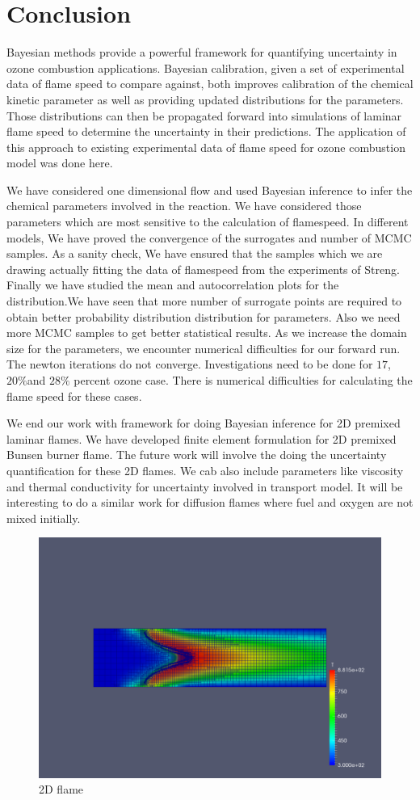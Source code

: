 
\chapter{Conclusion}\label{chap:conclusion}


Bayesian methods provide a powerful framework for quantifying uncertainty in ozone
combustion applications. Bayesian calibration, given a set of experimental data of flame speed to compare
against, both improves calibration of the chemical kinetic parameter as well as providing
updated distributions for the parameters. Those distributions can then be
propagated forward into simulations of laminar flame speed to determine the uncertainty in
their predictions. The application of this approach to existing experimental data of flame speed for ozone combustion model was done here.


 We have considered one dimensional flow and used Bayesian inference to infer the chemical parameters involved in the reaction. We have considered those parameters which are most sensitive to the calculation of flamespeed. In different models, We have proved the convergence of the surrogates and  number of MCMC samples. As a sanity check, We have ensured that the samples which we are drawing actually fitting the data of flamespeed from the experiments of Streng\cite{Streng}. Finally we have studied the mean and autocorrelation plots for the distribution.We have seen that more number of surrogate points are required to obtain better probability distribution distribution for parameters. Also we need more MCMC samples to get better statistical results. As we increase the domain size for the parameters, we encounter numerical difficulties for our forward run. The newton iterations do not converge. Investigations need to be done for $17$, $20 \% $and $ 28 \% $ percent ozone case. There is numerical difficulties for calculating the flame speed for these cases.

We end our work with  framework for doing Bayesian inference for 2D premixed laminar flames. We have developed finite element formulation for 2D premixed Bunsen burner flame. The future work will involve the doing the uncertainty quantification for these 2D flames. We cab also include parameters like viscosity and  thermal conductivity for uncertainty involved in transport model. It will be interesting to do a similar work for diffusion flames where fuel and oxygen are not mixed initially.

 \begin{figure}[H]
   \includegraphics[scale=0.35]{figs/flame_amr.pdf}
    \caption{2D flame}
 \end{figure}

